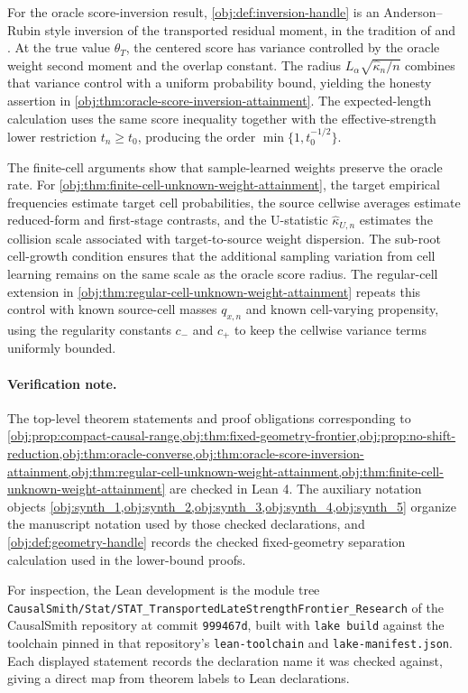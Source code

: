 For the oracle score-inversion result, \cref{obj:def:inversion-handle} is an Anderson--Rubin style inversion of the transported residual moment, in the tradition of \citet{AndersonRubin1949} and \citet{Fieller1954}.  At the true value \(\theta_T\), the centered score has variance controlled by the oracle weight second moment and the overlap constant.  The radius \(L_\alpha\sqrt{\widehat\kappa_n/n}\) combines that variance control with a uniform probability bound, yielding the honesty assertion in \cref{obj:thm:oracle-score-inversion-attainment}.  The expected-length calculation uses the same score inequality together with the effective-strength lower restriction \(t_n\ge t_0\), producing the order \(\min\{1,t_0^{-1/2}\}\).

The finite-cell arguments show that sample-learned weights preserve the oracle rate.  For \cref{obj:thm:finite-cell-unknown-weight-attainment}, the target empirical frequencies estimate target cell probabilities, the source cellwise averages estimate reduced-form and first-stage contrasts, and the U-statistic \(\widehat\kappa_{U,n}\) estimates the collision scale associated with target-to-source weight dispersion.  The sub-root cell-growth condition ensures that the additional sampling variation from cell learning remains on the same scale as the oracle score radius.  The regular-cell extension in \cref{obj:thm:regular-cell-unknown-weight-attainment} repeats this control with known source-cell masses \(q_{x,n}\) and known cell-varying propensity, using the regularity constants \(c_-\) and \(c_+\) to keep the cellwise variance terms uniformly bounded.

\paragraph{Verification note.}
The top-level theorem statements and proof obligations corresponding to \cref{obj:prop:compact-causal-range,obj:thm:fixed-geometry-frontier,obj:prop:no-shift-reduction,obj:thm:oracle-converse,obj:thm:oracle-score-inversion-attainment,obj:thm:regular-cell-unknown-weight-attainment,obj:thm:finite-cell-unknown-weight-attainment} are checked in Lean 4.  The auxiliary notation objects \cref{obj:synth_1,obj:synth_2,obj:synth_3,obj:synth_4,obj:synth_5} organize the manuscript notation used by those checked declarations, and \cref{obj:def:geometry-handle} records the checked fixed-geometry separation calculation used in the lower-bound proofs.

For inspection, the Lean development is the module tree \texttt{CausalSmith/Stat/STAT\_TransportedLateStrengthFrontier\_Research} of the CausalSmith repository at commit \texttt{999467d}, built with \texttt{lake build} against the toolchain pinned in that repository's \texttt{lean-toolchain} and \texttt{lake-manifest.json}. Each displayed statement records the declaration name it was checked against, giving a direct map from theorem labels to Lean declarations.

